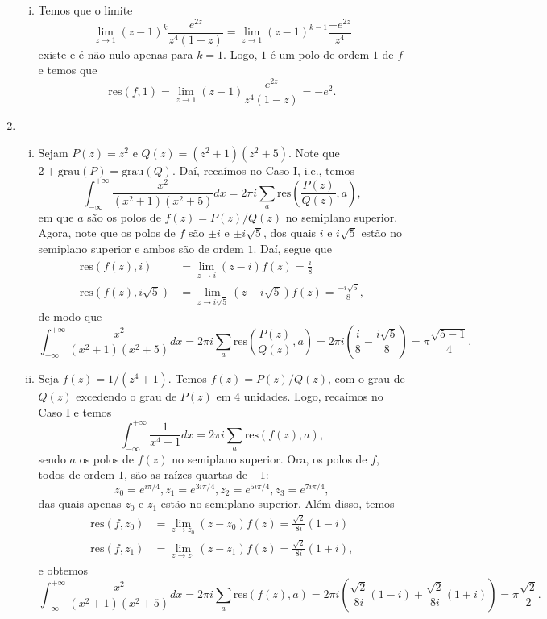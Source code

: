 \documentclass[12pt,a4paper]{article}
\newcommand{\res}{\mathrm{res}}
\begin{document}
\begin{enumerate}
\begin{enumerate}[(i)]
			\item Temos que o limite
			$$
			\lim\limits_{z\to 1}(z-1)^k\frac{e^{2z}}{z^4(1-z)} = \lim\limits_{z\to 1}(z-1)^{k-1}\frac{-e^{2z}}{z^4}
			$$
			existe e é não nulo apenas para $k=1$. Logo, $1$ é um polo de ordem $1$ de $f$ e temos que
			$$
			\res(f,1) = \lim\limits_{z\to 1}(z-1)\frac{e^{2z}}{z^4(1-z)} = -e^2.
			$$
		\end{enumerate}
	\item\begin{enumerate}[(i)]
		\item Sejam $P(z) = z^2$ e $Q(z) = (z^2+1)(z^2+5)$. Note que $2+\text{grau}(P) = \text{grau}(Q)$. Daí, recaímos no Caso I, i.e., temos
		$$
		\int_{-\infty}^{+\infty}\frac{x^2}{(x^2+1)(x^2+5)}dx = 2\pi i\sum_a\res\left( \frac{P(z)}{Q(z)},a \right),
		$$
		em que $a$ são os polos de $f(z) = P(z)/Q(z)$ no semiplano superior. Agora, note que os polos de $f$ são $\pm i$ e $\pm i\sqrt{5}$, dos quais $i$ e $i\sqrt{5}$ estão no semiplano superior e ambos são de ordem $1$. Daí, segue que
		\begin{align*}
		\res(f(z), i) &= \lim\limits_{z\to i}(z-i)f(z) = \frac{i}{8} \\
		\res(f(z), i\sqrt{5}) &= \lim\limits_{z\to i\sqrt{5}}(z-i\sqrt{5})f(z) = \frac{-i\sqrt{5}}{8},
		\end{align*}
		de modo que
		$$
		\int_{-\infty}^{+\infty}\frac{x^2}{(x^2+1)(x^2+5)}dx = 2\pi i\sum_a\res\left( \frac{P(z)}{Q(z)},a \right) = 2\pi i\left( \frac{i}{8} - \frac{i\sqrt{5}}{8}\right) = \pi\frac{\sqrt{5 - 1}}{4}.
		$$
		
		\item Seja $f(z) = 1/(z^4+1)$. Temos $f(z) = P(z)/Q(z)$, com o grau de $Q(z)$ excedendo o grau de $P(z)$ em $4$ unidades. Logo, recaímos no Caso I e temos
		$$
		\int_{-\infty}^{+\infty}\frac{1}{x^4+1}dx = 2\pi i\sum_a\res\left( f(z),a \right),
		$$
		sendo $a$ os polos de $f(z)$ no semiplano superior. Ora, os polos de $f$, todos de ordem $1$, são as raízes quartas de $-1$:
		$$
		z_0 = e^{i\pi/4}, z_1 = e^{3i\pi/4}, z_2 = e^{5i\pi/4}, z_3 = e^{7i\pi/4},
		$$
		das quais apenas $z_0$ e $z_1$ estão no semiplano superior. Além disso, temos
		\begin{align*}
		\res(f,z_0) &= \lim\limits_{z\to z_0}(z-z_0)f(z) = \frac{\sqrt{2}}{8i}(1-i) \\
		\res(f,z_1) &= \lim\limits_{z\to z_1}(z-z_1)f(z) = \frac{\sqrt{2}}{8i}(1+i),
		\end{align*}
		e obtemos
		$$
		\int_{-\infty}^{+\infty}\frac{x^2}{(x^2+1)(x^2+5)}dx = 2\pi i\sum_a\res\left(f(z),a \right) = 2\pi i\left( \frac{\sqrt{2}}{8i}(1-i) + \frac{\sqrt{2}}{8i}(1+i) \right) = \pi\frac{\sqrt{2}}{2}.
		$$
		

\end{enumerate}
\end{enumerate}
\end{document}
